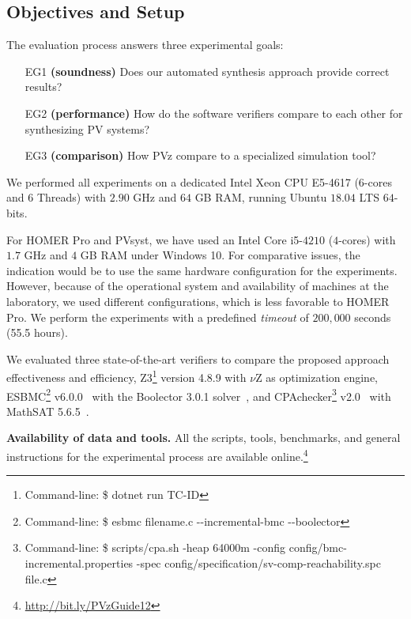 \documentclass[a4paper,donotrepeattitle,fleqn]{cas-dc}
\begin{document}
\subsection{Objectives and Setup}
\label{ObjectivesAndSetup}

The evaluation process answers three experimental goals:

\begin{tcolorbox}
\begin{enumerate}
\item [EG1] \textbf{(soundness)} Does our automated synthesis approach provide correct results?
\item [EG2] \textbf{(performance)} How do the software verifiers compare to each other for synthesizing PV systems?
\item [EG3] \textbf{(comparison)} How PVz compare to a specialized simulation tool?
\end{enumerate}
\end{tcolorbox}

We performed all experiments on a dedicated Intel Xeon CPU E5-4617 ($6$-cores and 6 Threads) with $2.90$ GHz and $64$ GB RAM, running Ubuntu $18.04$ LTS $64$-bits.

For HOMER Pro and PVsyst, we have used an Intel Core i5-$4210$ ($4$-cores) with $1.7$ GHz and $4$ GB RAM under Windows 10. For comparative issues, the indication would be to use the same hardware configuration for the experiments. However, because of the operational system and availability of machines at the laboratory, we used different configurations, which is less favorable to HOMER Pro. We perform the experiments with a predefined \textit{timeout} of $200,000$ seconds (55.5 hours).

We evaluated three state-of-the-art verifiers to compare the proposed approach effectiveness and efficiency, Z3\footnote{Command-line: \$ dotnet run TC-ID} version 4.8.9 with $\nu$Z as optimization engine, ESBMC\footnote{Command-line: \$ esbmc filename.c -\phantom{}-incremental-bmc -\phantom{}-boolector} v6.0.0~\cite{esbmc2018} with the Boolector 3.0.1 solver~\cite{Brummayer}, and CPAchecker\footnote{Command-line: \$ scripts/cpa.sh -heap 64000m -config config/bmc-incremental.properties -spec config/specification/sv-comp-reachability.spc file.c} v2.0~\cite{Beyer2011} with MathSAT 5.6.5~\cite{mathsat5}. 

\noindent \textbf{Availability of data and tools.} All the scripts, tools, benchmarks, and general instructions for the experimental process are available online.\footnote{\url{http://bit.ly/PVzGuide12}}
\end{document}

